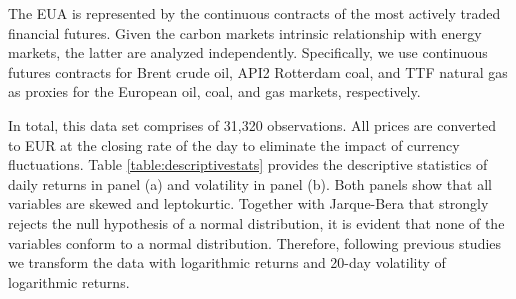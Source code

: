 \documentclass[preprint, 3p,
authoryear]{elsarticle} %
\begin{document}
The EUA is represented by the continuous contracts of the most actively
traded financial futures. Given the carbon markets intrinsic
relationship with energy markets, the latter are analyzed independently.
Specifically, we use continuous futures contracts for Brent crude oil,
API2 Rotterdam coal, and TTF natural gas as proxies for the European
oil, coal, and gas markets, respectively.

In total, this data set comprises of 31,320 observations. All prices are
converted to EUR at the closing rate of the day to eliminate the impact
of currency fluctuations. Table \ref{table:descriptivestats} provides
the descriptive statistics of daily returns in panel (a) and volatility
in panel (b). Both panels show that all variables are skewed and
leptokurtic. Together with Jarque-Bera that strongly rejects the null
hypothesis of a normal distribution, it is evident that none of the
variables conform to a normal distribution. Therefore, following
previous studies
\citep{diebold_better_2012, reboredo_volatility_2014, gabauer_dynamic_2021}
we transform the data with logarithmic returns and 20-day volatility of
logarithmic returns.
\end{document}
